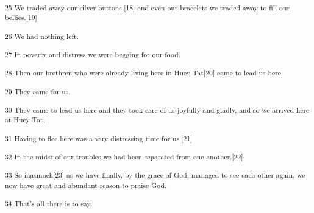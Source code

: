 \textsuperscript{25 We traded away our silver buttons,[18] and even our bracelets
we traded away to fill our bellies.[19]}

\textsuperscript{26 We had nothing left. }

\textsuperscript{27 In poverty and distress we were begging for our food.}

\textsuperscript{28 Then our brethren who were already living here in Huey Tat[20]
came to lead us here. }

\textsuperscript{29 They came for us. }

\textsuperscript{30 They came to lead us here and they took care of us joyfully
and gladly, and so we arrived here at Huey Tat. }

\textsuperscript{31 Having to flee here was a very distressing time for us.[21]}

\textsuperscript{32 In the midst of our troubles we had been separated from one
another.[22]}

\textsuperscript{33 So inasmuch[23] as we have finally, by the grace of God, managed
to see each other again, we now have great and abundant reason to praise God. }

\textsuperscript{34 That's all there is to say.}

